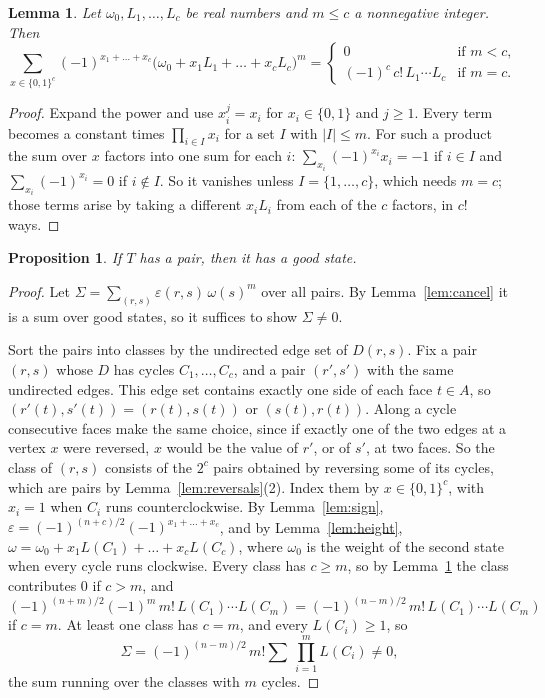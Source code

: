 \documentclass[10pt]{amsart}
\numberwithin{equation}{section}
\newtheorem{proposition}[equation]{Proposition}
\newtheorem{lemma}[equation]{Lemma}
\theoremstyle{definition}
\theoremstyle{remark}
\newcommand{\T}{T}
\newcommand{\eps}{\varepsilon}
\begin{document}
\begin{lemma}\label{lem:difference}
Let $\omega_0,L_1,\dots,L_c$ be real numbers and $m\le c$ a nonnegative integer.
Then
\[
\sum_{x\in\{0,1\}^c}(-1)^{x_1+\dots+x_c}\bigl(\omega_0+x_1L_1+\dots+x_cL_c\bigr)^m
=\begin{cases}0 & \text{if } m<c,\\ (-1)^c\,c!\,L_1\cdots L_c & \text{if } m=c.\end{cases}
\]
\end{lemma}

\begin{proof}
Expand the power and use $x_i^j=x_i$ for $x_i\in\{0,1\}$ and $j\ge1$.
Every term becomes a constant times $\prod_{i\in I}x_i$ for a set $I$ with $|I|\le m$.
For such a product the sum over $x$ factors into one sum for each $i$: $\sum_{x_i}(-1)^{x_i}x_i=-1$ if $i\in I$ and $\sum_{x_i}(-1)^{x_i}=0$ if $i\notin I$.
So it vanishes unless $I=\{1,\dots,c\}$, which needs $m=c$; those terms arise by taking a different $x_iL_i$ from each of the $c$ factors, in $c!$ ways.
\end{proof}

\begin{proposition}\label{prop:good}
If $\T$ has a pair, then it has a good state.
\end{proposition}

\begin{proof}
Let $\Sigma=\sum_{(r,s)}\eps(r,s)\,\omega(s)^m$ over all pairs.
By Lemma~\ref{lem:cancel} it is a sum over good states, so it suffices to show $\Sigma\neq0$.

Sort the pairs into classes by the undirected edge set of $D(r,s)$.
Fix a pair $(r,s)$ whose $D$ has cycles $C_1,\dots,C_c$, and a pair $(r',s')$ with the same undirected edges.
This edge set contains exactly one side of each face $t\in A$, so $(r'(t),s'(t))=(r(t),s(t))$ or $(s(t),r(t))$.
Along a cycle consecutive faces make the same choice, since if exactly one of the two edges at a vertex $x$ were reversed, $x$ would be the value of $r'$, or of $s'$, at two faces.
So the class of $(r,s)$ consists of the $2^c$ pairs obtained by reversing some of its cycles, which are pairs by Lemma~\ref{lem:reversals}(2).
Index them by $x\in\{0,1\}^c$, with $x_i=1$ when $C_i$ runs counterclockwise.
By Lemma~\ref{lem:sign}, $\eps=(-1)^{(n+c)/2}(-1)^{x_1+\dots+x_c}$, and by Lemma~\ref{lem:height}, $\omega=\omega_0+x_1L(C_1)+\dots+x_cL(C_c)$, where $\omega_0$ is the weight of the second state when every cycle runs clockwise.
Every class has $c\ge m$, so by Lemma~\ref{lem:difference} the class contributes $0$ if $c>m$, and
\[
(-1)^{(n+m)/2}(-1)^m\,m!\,L(C_1)\cdots L(C_m)=(-1)^{(n-m)/2}\,m!\,L(C_1)\cdots L(C_m)
\]
if $c=m$.
At least one class has $c=m$, and every $L(C_i)\ge1$, so
\[
\Sigma=(-1)^{(n-m)/2}\,m!\sum\ \prod_{i=1}^m L(C_i)\neq0,
\]
the sum running over the classes with $m$ cycles.
\end{proof}
\end{document}
